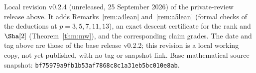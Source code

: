 \par\noindent\small Local revision v0.2.4 (unreleased, 25 September 2026) of the private-review release above. It adds Remarks~\ref{rem:a4lean} and~\ref{rem:a5lean} (formal checks of the deductions at $p=3,5,7,11,13$), an exact descent certificate for the rank and $\Sha[2]$ (Theorem~\ref{thm:mw}), and the corresponding claim grades. The date and tag above are those of the base release v0.2.2; this revision is a local working copy, not yet published, with no tag or snapshot link. Base mathematical source snapshot: \nolinkurl{bf75979a9fb1b53af7868c8c1a31eb5bc010e8ab}.\normalsize
